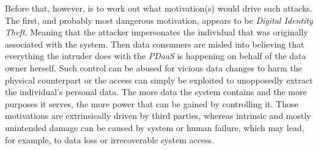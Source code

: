 \documentclass[12pt,english,a4paper,titlepage,cleardoublepage=empty,dottedtoc]{report}
\begin{document}
Before that, however, is to work out what motivation(s) would drive such
attacks. The first, and probably most dangerous motivation, appears to
be \emph{Digital Identity Theft}. Meaning that the attacker impersonates
the individual that was originally associated with the system. Then data
consumers are misled into believing that everything the intruder does
with the \emph{PDaaS} is happening on behalf of the data owner herself.
Such control can be abused for vicious data changes to harm the physical
counterpart or the access can simply be exploited to unopposedly extract
the individual's personal data. The more data the system contains and
the more purposes it serves, the more power that can be gained by
controlling it. Those motivations are extrinsically driven by third
parties, whereas intrinsic and mostly unintended damage can be caused by
system or human failure, which may lead, for example, to data loss or
irrecoverable system access.
\end{document}
